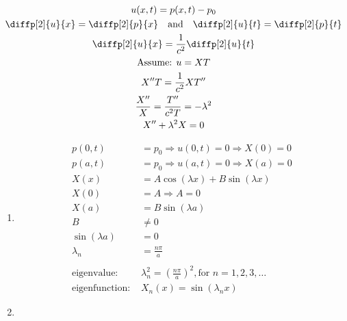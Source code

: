 \documentclass[../../HW06.tex]{subfiles}
\begin{document}
\begin{gather*}
    u(x,t) =p(x,t)-p_{0} \\
    \diffp[2]{u}{x} = \diffp[2]{p}{x} \quad\text{and}\quad \diffp[2]{u}{t} = \diffp[2]{p}{t} \\
    \diffp[2]{u}{x} = \frac{1}{c^{2}} \diffp[2]{u}{t} \\
    \text{Assume: } u=XT \\
    X''T = \frac{1}{c^{2}}XT'' \\
    \frac{X''}{X} = \frac{T''}{c^{2}T} = -\lambda^{2} \\
    X'' + \lambda^{2}X = 0
\end{gather*}
\begin{enumerate}
    \item \begin{align*}
              p(0,t)                 & =p_{0} \Rightarrow u(0,t)=0 \Rightarrow X(0) = 0                                     \\
              p(a,t)                 & =p_{0} \Rightarrow u(a,t)=0 \Rightarrow X(a) = 0                                     \\
              X(x)                   & =A\cos(\lambda x) + B\sin(\lambda x)                                                 \\
              X(0)                   & = A \Rightarrow A = 0                                                                \\
              X(a)                   & = B\sin(\lambda a)                                                                   \\
              B                      & \ne 0                                                                                \\
              \sin(\lambda a)        & = 0                                                                                  \\
              \lambda_{n}            & = \frac{n \pi}{a}                                                                    \\
              \\
              \text{eigenvalue: }    & \lambda_{n}^{2} = \left(  \frac{n\pi}{a} \right)^{2}, \text{for } n = 1, 2, 3, \dots \\
              \text{eigenfunction: } & X_{n}(x) = \sin(\lambda_{n}x)
          \end{align*}
    \item \begin{align*}

\end{align*}
\end{enumerate}
\end{document}
